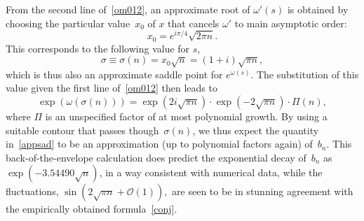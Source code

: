 \documentclass{amsart}
\newtheorem{theorem}{Theorem}
\begin{document}
From the second line of~\eqref{om012}, an approximate root of $\omega'(s)$
is obtained by choosing the particular value~$x_0$ of $x$ that cancels 
$\omega'$ to main asymptotic order:
\begin{equation}\label{x0}
x_0=e^{i\pi/4}\sqrt{2\pi n}.
\end{equation}
This corresponds to the following value for $s$,
\begin{equation}\label{sad0}
\sigma\equiv \sigma(n)= x_0\sqrt{n} = %
(1+i)\sqrt{\pi n},
\end{equation}
which is thus also an approximate saddle point for $e^{\omega(s)}$.
The substitution of this value given the first line of~\eqref{om012} then leads to
\begin{equation}\label{appsad}
\exp\left(\omega(\sigma(n))\right)
=\exp\left(2i\sqrt{\pi n}\right) \cdot \exp\left(-2\sqrt{\pi n}\right)\cdot \Pi(n),
\end{equation}
where $\Pi$ is an
unspecified factor of at most polynomial growth. 
By using a suitable contour that passes though~$\sigma(n)$,
we thus expect the quantity in~\eqref{appsad} to be an approximation
(up to polynomial factors again) of~$b_n$. This back-of-the-envelope calculation
does predict  the exponential decay of~$b_n$ as $\exp\left(-3.54490\sqrt{n}\right)$,
in a way consistent with numerical data, while 
the fluctuations,
$
\sin\left(2\sqrt{\pi n}+\mathcal{O}(1)\right),
$
are seen to be in stunning agreement with the empirically obtained formula~\eqref{conj}.

% 
\end{document}

